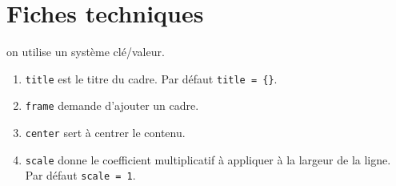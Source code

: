 \documentclass[12pt,a4paper]{article}
\begin{document}


\section{Fiches techniques}


\IDoption{} on utilise un système clé/valeur.
\begin{enumerate}
	\item \verb#title# est le titre du cadre.
	      Par défaut \verb#title = {}#.

	\item \verb#frame# demande d'ajouter un cadre.

	\item \verb#center# sert à centrer le contenu.

	\item \verb#scale# donne le coefficient multiplicatif à appliquer à la largeur de la ligne.
	      Par défaut \verb#scale = 1#.
\end{enumerate}
\end{document}
